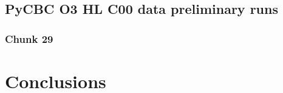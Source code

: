 \documentclass[binding=0.6cm, LaM]{sapthesis}
\begin{document}
\section{PyCBC O3 HL C00 data preliminary runs}

\subsection{Chunk 29}

\chapter{Conclusions}


\backmatter
\cleardoublepage


\begin{thebibliography}{100}
\end{thebibliography}
\end{document}

